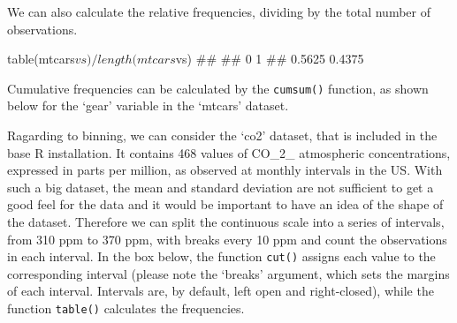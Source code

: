 \documentclass[a4paper,12pt,oneside]{book}
\newenvironment{Shaded}{\begin{snugshade}}{\end{snugshade}}
\newcommand{\SpecialCharTok}[1]{#1}
\newcommand{\DocumentationTok}[1]{#1}
\newcommand{\FunctionTok}[1]{#1}
\newcommand{\NormalTok}[1]{#1}
\begin{document}
We can also calculate the relative frequencies, dividing by the total number of observations.

\begin{Shaded}
\begin{Highlighting}[]
\FunctionTok{table}\NormalTok{(mtcars}\SpecialCharTok{$}\NormalTok{vs)}\SpecialCharTok{/}\FunctionTok{length}\NormalTok{(mtcars}\SpecialCharTok{$}\NormalTok{vs)}
\DocumentationTok{\#\# }
\DocumentationTok{\#\#      0      1 }
\DocumentationTok{\#\# 0.5625 0.4375}
\end{Highlighting}
\end{Shaded}

Cumulative frequencies can be calculated by the \texttt{cumsum()} function, as shown below for the `gear' variable in the `mtcars' dataset.

\begin{Shaded}
\end{Shaded}

Ragarding to binning, we can consider the `co2' dataset, that is included in the base R installation. It contains 468 values of CO\_2\_ atmospheric concentrations, expressed in parts per million, as observed at monthly intervals in the US. With such a big dataset, the mean and standard deviation are not sufficient to get a good feel for the data and it would be important to have an idea of the shape of the dataset. Therefore we can split the continuous scale into a series of intervals, from 310 ppm to 370 ppm, with breaks every 10 ppm and count the observations in each interval. In the box below, the function \texttt{cut()} assigns each value to the corresponding interval (please note the `breaks' argument, which sets the margins of each interval. Intervals are, by default, left open and right-closed), while the function \texttt{table()} calculates the frequencies.
\end{document}
